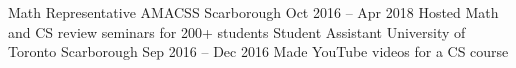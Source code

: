 \begin{cvhonors}
  \cvhonor
    {Math Representative}
    {AMACSS}
    {Scarborough}
    {Oct 2016 -- Apr 2018}
    {Hosted Math and CS review seminars for 200+ students}
  \cvhonor
    {Student Assistant}
    {University of Toronto}
    {Scarborough}
    {Sep 2016 -- Dec 2016}
    {Made YouTube videos for a CS course}
\end{cvhonors}